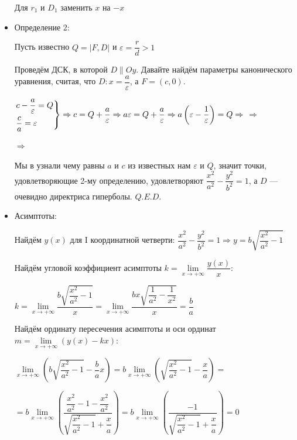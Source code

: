 \documentclass[twoside]{book}
\begin{document}
\begin{itemize}
          Для \(r_1\) и \(D_1\) заменить \(x\) на \(-x\)

    \item Определение 2:

          Пусть известно \(Q = |F, D|\) и \(\varepsilon = \dfrac{r}{d} > 1\)

          Проведём ДСК, в которой \(D \parallel Oy\). Давайте найдём параметры канонического уравнения, считая, что \(D: x = \dfrac{a}{\varepsilon}\), а \(F = (c, 0)\).

          \(\begin{rcases}
              c - \dfrac{a}{\varepsilon} = Q \\
              \dfrac{c}{a} = \varepsilon
          \end{rcases} \Rightarrow c = Q + \dfrac{a}{\varepsilon} \Rightarrow a \varepsilon = Q + \dfrac{a}{\varepsilon} \Rightarrow a \left(\varepsilon - \dfrac{1}{\varepsilon}\right) = Q \Rightarrow\)  \(\Rightarrow\)

          \(\Rightarrow\) 

          Мы в узнали чему равны \(a\) и \(c\) из известных нам \(\varepsilon\) и \(Q\), значит точки, удовлетворяющие 2-му определению, удовлетворяют \(\dfrac{x^2}{a^2} - \dfrac{y^2}{b^2} = 1\), а \(D\) --- очевидно директриса гиперболы. \(Q.E.D.\)

    \item Асимптоты:

          Найдём \(y(x)\) для I координатной четверти: \(\dfrac{x^2}{a^2} - \dfrac{y^2}{b^2} = 1 \Rightarrow y = b \sqrt{\dfrac{x^2}{a^2} - 1}\)

          Найдём угловой коэффициент асимптоты \(k = \lim\limits_{x \to +\infty}\dfrac{y(x)}{x}\):

          \(k = \lim\limits_{x \to +\infty} \dfrac{b \sqrt{\dfrac{x^2}{a^2} - 1}}{x} = \lim\limits_{x \to +\infty} \dfrac{b x \sqrt{\dfrac{1}{a^2} - \dfrac{1}{x^2}}}{x} = \dfrac{b}{a}\)

          Найдём ординату пересечения асимптоты и оси ординат \(m = \lim\limits_{x \to +\infty}(y(x) - kx)\):

          \(\lim\limits_{x \to +\infty} \left(b \sqrt{\dfrac{x^2}{a^2} - 1} - \dfrac{b}{a}x\right) = b \lim\limits_{x \to +\infty} \left(\sqrt{\dfrac{x^2}{a^2} - 1} - \dfrac{x}{a}\right) =\)

          \(=b \lim\limits_{x \to +\infty} \left(\dfrac{\dfrac{x^2}{a^2} - 1 - \dfrac{x^2}{a^2}}{\sqrt{\dfrac{x^2}{a^2} - 1} + \dfrac{x}{a}} \right) = b \lim\limits_{x \to +\infty} \left(\dfrac{-1}{\sqrt{\dfrac{x^2}{a^2} - 1} + \dfrac{x}{a}} \right) = 0\)


\end{itemize}
\end{document}
